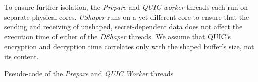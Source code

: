 To ensure further isolation, the \textit{Prepare} and \textit{QUIC worker} threads each run on separate physical cores.
\textit{UShaper} runs on a yet different core to ensure that the sending and receiving of unshaped, secret-dependent data does not affect the execution time of either of the \textit{DShaper} threads.
We assume that QUIC's encryption and decryption time correlates only with the shaped buffer's size, not its content.



\begin{minipage}{\textwidth}

\captionsetup{type=lstlisting}
\caption{Pseudo-code of the \textit{Prepare} and \textit{QUIC Worker} threads}
\label{lst:prepare_and_worker}
\end{minipage}
